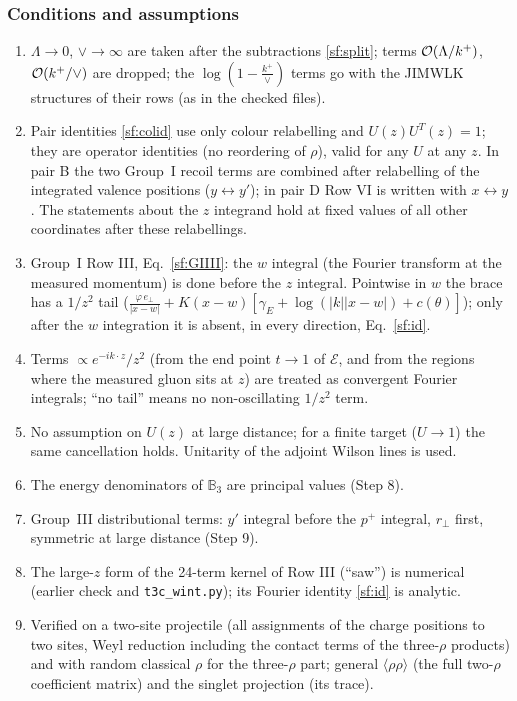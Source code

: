 \documentclass[10pt]{article}
\def\mf#1{\mathbb{#1}}
\begin{document}
\subsubsection{Conditions and assumptions}
\begin{enumerate}
\item[(C1)] $\Lambda\to0$, $\vee\to\infty$ are taken after the subtractions \eqref{sf:split}; terms ${\cal O}(\Lambda/k^{+})$, ${\cal O}(k^{+}/\vee)$ are dropped; the $\log(1-\frac{k^{+}}{\vee})$ terms go with the JIMWLK structures of their rows (as in the checked files).
\item[(C2)] Pair identities \eqref{sf:colid} use only colour relabelling and $U(z)U^{T}(z)=1$; they are operator identities (no reordering of $\rho$), valid for any $U$ at any $z$. In pair B the two Group~I recoil terms are combined after relabelling of the integrated valence positions ($y\leftrightarrow y'$); in pair D Row VI is written with $x\leftrightarrow y$. The statements about the $z$ integrand hold at fixed values of all other coordinates after these relabellings.
\item[(C3)] Group~I Row III, Eq.~\eqref{sf:GIIII}: the $w$ integral (the Fourier transform at the measured momentum) is done before the $z$ integral. Pointwise in $w$ the brace has a $1/z^{2}$ tail ($\frac{\varphi\,e_{\perp}}{|x-w|}+K(x-w)[\gamma_{E}+\log(|k||x-w|)+c(\theta)]$); only after the $w$ integration it is absent, in every direction, Eq.~\eqref{sf:id}.
\item[(C4)] Terms $\propto e^{-ik\cdot z}/z^{2}$ (from the end point $t\to1$ of $\mathcal{E}$, and from the regions where the measured gluon sits at $z$) are treated as convergent Fourier integrals; ``no tail'' means no non-oscillating $1/z^{2}$ term.
\item[(C5)] No assumption on $U(z)$ at large distance; for a finite target ($U\to1$) the same cancellation holds. Unitarity of the adjoint Wilson lines is used.
\item[(C6)] The energy denominators of $\mf{B}_{3}$ are principal values (Step 8).
\item[(C7)] Group~III distributional terms: $y'$ integral before the $p^{+}$ integral, $r_{\perp}$ first, symmetric at large distance (Step 9).
\item[(C8)] The large-$z$ form of the 24-term kernel of Row III (``saw'') is numerical (earlier check and \texttt{t3c\_wint.py}); its Fourier identity \eqref{sf:id} is analytic.
\item[(C9)] Verified on a two-site projectile (all assignments of the charge positions to two sites, Weyl reduction including the contact terms of the three-$\rho$ products) and with random classical $\rho$ for the three-$\rho$ part; general $\langle\rho\rho\rangle$ (the full two-$\rho$ coefficient matrix) and the singlet projection (its trace).
\end{enumerate}
\end{document}
